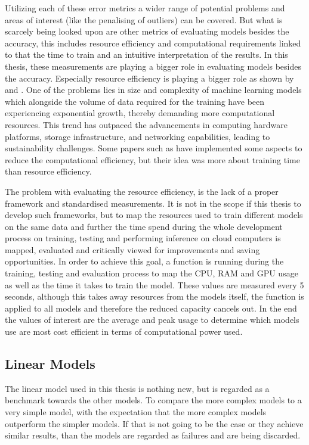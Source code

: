 \documentclass{article}
\begin{document}
Utilizing each of these error metrics a wider range of potential problems and areas of interest (like the penalising of outliers) can be covered. But what is scarcely being looked upon are other metrics of evaluating models besides the accuracy, this includes resource efficiency and computational requirements linked to that the time to train and an intuitive interpretation of the results. In this thesis, these measurements are playing a bigger role in evaluating models besides the accuracy. Especially resource efficiency is playing a bigger role as shown by \cite{AI_energy_consumption} and \cite{resource_awareness}. One of the problems lies in size and complexity of machine learning models which alongside the volume of data required for the training have been experiencing exponential growth, thereby demanding more computational resources. This trend has outpaced the advancements in computing hardware platforms, storage infrastructure, and networking capabilities, leading to sustainability challenges. Some papers such as \cite{Informer} have implemented some aspects to reduce the computational efficiency, but their idea was more about training time than resource efficiency. \par 
The problem with evaluating the resource efficiency, is the lack of a proper framework and standardised measurements. It is not in the scope if this thesis to develop such frameworks, but to map the resources used to train different models on the same data and further the time spend during the whole development process on training, testing and performing inference on cloud computers is mapped, evaluated and critically viewed for improvements and saving opportunities. In order to achieve this goal, a function is running during the training, testing and evaluation process to map the CPU, RAM and GPU usage as well as the time it takes to train the model. These values are measured every 5 seconds, although this takes away resources from the models itself, the function is applied to all models and therefore the reduced capacity cancels out. In the end the values of interest are the average and peak usage to determine which models use are most cost efficient in terms of computational power used.

\subsection{Linear Models}

The linear model used in this thesis is nothing new, but is regarded as a benchmark towards the other models. To compare the more complex models to a very simple model, with the expectation that the more complex models outperform the simpler models. If that is not going to be the case or they achieve similar results, than the models are regarded as failures and are being discarded. \par 
\end{document}
